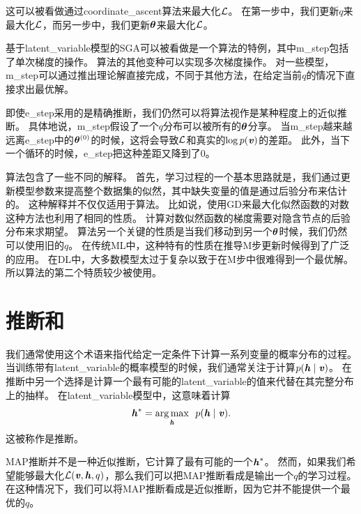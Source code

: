 这可以被看做通过\gls{coordinate_ascent}算法来最大化$\mathcal{L}$。
在第一步中，我们更新$q$来最大化$\mathcal{L}$，而另一步中，我们更新$\boldsymbol{\theta}$来最大化$\mathcal{L}$。


基于\gls{latent_variable}模型的\gls{SGA}可以被看做是一个算法的特例，其中\gls{m_step}包括了单次梯度的操作。
算法的其他变种可以实现多次梯度操作。
对一些模型，\gls{m_step}可以通过推出理论解直接完成，不同于其他方法，在给定当前$q$的情况下直接求出最优解。


即使\gls{e_step}采用的是精确推断，我们仍然可以将算法视作是某种程度上的近似推断。
具体地说，\gls{m_step}假设了一个$q$分布可以被所有的$\boldsymbol{\theta}$分享。
当\gls{m_step}越来越远离\gls{e_step}中的$\boldsymbol{\theta}^{(0)}$的时候，这将会导致$\mathcal{L}$和真实的$\log p(\boldsymbol{\mathit{v}})$的差距。
此外，当下一个循环的时候，\gls{e_step}把这种差距又降到了$0$。



算法包含了一些不同的解释。
首先，学习过程的一个基本思路就是，我们通过更新模型参数来提高整个数据集的似然，其中缺失变量的值是通过后验分布来估计的。
这种解释并不仅仅适用于算法。
比如说，使用\gls{GD}来最大化似然函数的对数这种方法也利用了相同的性质。
计算对数似然函数的梯度需要对隐含节点的后验分布来求期望。 
算法另一个关键的性质是当我们移动到另一个$\boldsymbol{\theta}$时候，我们仍然可以使用旧的$q$。
在传统\gls{ML}中，这种特有的性质在推导M步更新时候得到了广泛的应用。
在\gls{DL}中，大多数模型太过于复杂以致于在M步中很难得到一个最优解。
所以算法的第二个特质较少被使用。


\section{推断和}
\label{sec:map_inference_and_sparse_coding}


我们通常使用这个术语来指代给定一定条件下计算一系列变量的概率分布的过程。
当训练带有\gls{latent_variable}的概率模型的时候，我们通常关注于计算$p(\boldsymbol{\mathit{h}}\mid\boldsymbol{\mathit{v}})$。
在推断中另一个选择是计算一个最有可能的\gls{latent_variable}的值来代替在其完整分布上的抽样。
在\gls{latent_variable}模型中，这意味着计算
\begin{align}
\boldsymbol{\mathit{h}}^* = \underset{\boldsymbol{\mathit{h}}}{\arg\max} \ \  p(\boldsymbol{\mathit{h}}\mid\boldsymbol{\mathit{v}}).
\end{align}
这被称作是推断。



\gls{MAP}推断并不是一种近似推断，它计算了最有可能的一个$\boldsymbol{\mathit{h}}^*$。
然而，如果我们希望能够最大化$\mathcal{L}(\boldsymbol{\mathit{v}},\boldsymbol{\mathit{h}},q)$，那么我们可以把\gls{MAP}推断看成是输出一个$q$的学习过程。%
在这种情况下，我们可以将\gls{MAP}推断看成是近似推断，因为它并不能提供一个最优的$q$。



